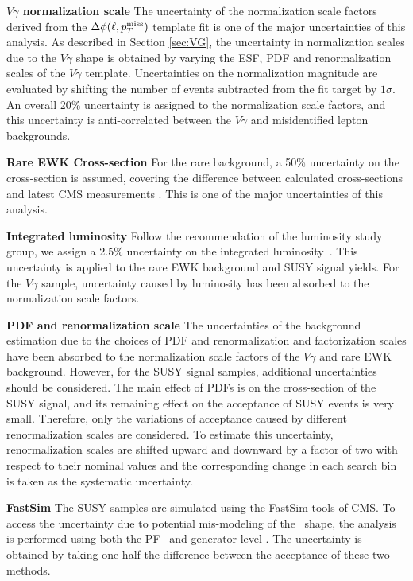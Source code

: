 \documentclass[thesis.tex]{subfiles}
\renewcommand\_{\textunderscore\allowbreak}
\begin{document}
\noindent \textbf{$V\gamma$ normalization scale}
\quad The uncertainty of the normalization scale factors derived from the $\Delta\phi(\ell, p_T^\textrm{miss})$ template fit is one of the major uncertainties of this analysis. 
As described in Section \ref{sec:VG}, the uncertainty in normalization scales due to the $V\gamma$ shape is obtained by varying the ESF, PDF and renormalization scales of the $V\gamma$ template. 
Uncertainties on the normalization magnitude are evaluated by shifting the number of events subtracted from the fit target by $1\sigma$. 
An overall 20\% uncertainty is assigned to the normalization scale factors, and this uncertainty is anti-correlated between the $V\gamma$ and misidentified lepton backgrounds. 

\noindent \textbf{Rare EWK Cross-section}
\quad For the rare background, a 50\% uncertainty on the cross-section is assumed, covering the difference between calculated cross-sections and latest CMS measurements \cite{CMS:ttgxs,CMS:ttxs}. 
This is one of the major uncertainties of this analysis. 

\noindent \textbf{Integrated luminosity}
\quad Follow the recommendation of the luminosity study group, we assign a 2.5\% uncertainty on the integrated luminosity~\cite{CMS-PAS-LUM-17-001}. 
This uncertainty is applied to the rare EWK background and SUSY signal yields. 
For the $V\gamma$ sample, uncertainty caused by luminosity has been absorbed to the normalization scale factors.

\noindent \textbf{PDF and renormalization scale} 
\quad The uncertainties of the background estimation due to the choices of PDF and renormalization and factorization scales have been absorbed to the normalization scale factors of the $V\gamma$ and rare EWK background.
However, for the SUSY signal samples, additional uncertainties should be considered. 
The main effect of PDFs is on the cross-section of the SUSY signal, and its remaining effect on the acceptance of SUSY events is very small. 
Therefore, only the variations of acceptance caused by different renormalization scales are considered. 
To estimate this uncertainty, renormalization scales are shifted upward and downward by a factor of two with respect to their nominal values and the corresponding change in each search bin is taken as the systematic uncertainty. 

\noindent \textbf{FastSim \MET}
\quad The SUSY samples are simulated using the FastSim tools of CMS. 
To access the uncertainty due to potential mis-modeling of the \MET~shape, the analysis is performed using both the PF-\MET~and generator level \MET. 
The uncertainty is obtained by taking one-half the difference between the acceptance of these two methods.  
\end{document}

